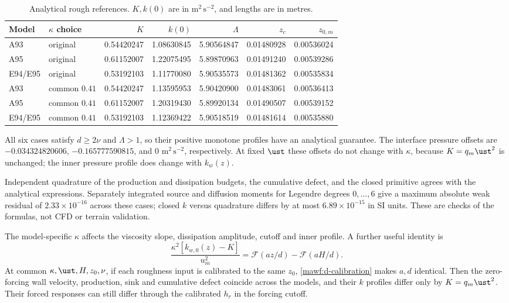 \begin{table}[htbp]
\centering\small
\caption{Analytical rough references. \(K,k(0)\) are in
\(\mathrm{m^2\,s^{-2}}\), and lengths are in metres.}
\label{mawf:numerical-table}
\begin{tabular}{@{}llrrrrr@{}}
\toprule
Model&\(\kappa\) choice&\(K\)&\(k(0)\)&\(\Lambda\)&\(z_c\)&\(z_{0,m}\)\\
\midrule
A93&original&0.54420247&1.08630845&5.90564847&0.01480928&0.00536024\\
A95&original&0.61152007&1.22075495&5.89870963&0.01491240&0.00539286\\
E94/E95&original&0.53192103&1.11770080&5.90535573&0.01481362&0.00535834\\
\midrule
A93&common \(0.41\)&0.54420247&1.13595953&5.90420900&0.01483061&0.00536413\\
A95&common \(0.41\)&0.61152007&1.20319430&5.89920134&0.01490507&0.00539152\\
E94/E95&common \(0.41\)&0.53192103&1.12369422&5.90518519&0.01481614&0.00535880\\
\bottomrule
\end{tabular}
\end{table}

All six cases satisfy \(d\ge2\nu\) and \(\Lambda>1\), so their
positive monotone profiles have an analytical guarantee.
The interface pressure offsets are
\(-0.034324820606\), \(-0.165777590815\), and \(0\)
\(\mathrm{m^2\,s^{-2}}\), respectively.
At fixed \(\ust\) these offsets do not change with \(\kappa\),
because \(K=q_m\ust^2\) is unchanged; the inner pressure profile
does change with \(k_w(z)\).

Independent quadrature of the production and dissipation budgets,
the cumulative defect, and the closed primitive agrees with the
analytical expressions. Separately integrated source and diffusion
moments for Legendre degrees \(0,\ldots,6\) give a maximum absolute
weak residual of \(2.33\times10^{-16}\) across these cases;
closed \(k\) versus quadrature differs by at most
\(6.89\times10^{-15}\) in SI units. These are checks of the
formulas, not CFD or terrain validation.

The model-specific \(\kappa\) affects the viscosity slope,
dissipation amplitude, cutoff and inner profile. A further useful
identity is
\[
 \frac{\kappa^2[k_{w,0}(z)-K]}{u_m^2}
 =\mathcal F(az/d)-\mathcal F(aH/d).
\]
At common \(\kappa,\ust,H,z_0,\nu\), if each roughness input
is calibrated to the same \(z_0\), \cref{mawf:d-calibration}
makes \(a,d\) identical. Then the zero-forcing wall velocity,
production, sink and cumulative defect coincide across the models,
and their \(k\) profiles differ only by \(K=q_m\ust^2\).
Their forced responses can still differ through the calibrated
\(h_r\) in the forcing cutoff.

